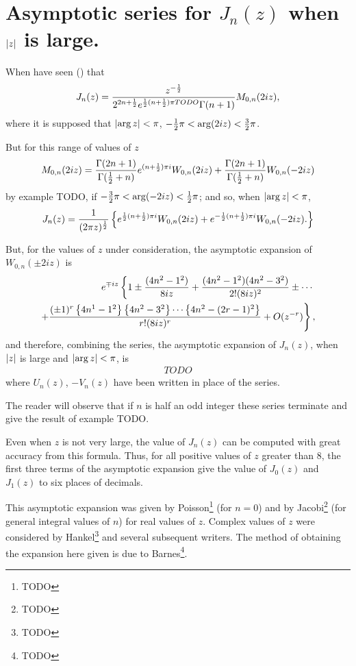\documentclass{book}
\begin{document}
\section{Asymptotic series for $J_n(z)$ when $\left| z \right|$ is large.}
When have seen () that
$$
J_n(z)
=
\frac{z^{-\frac{1}{2}}}{2^{2n+\frac{1}{2}} e^{\frac{1}{2}(n+\frac{1}{2})\pi TODO} \Gamma(n+1)}
M_{0,n}(2iz),
$$
where it is supposed that 
$\left|  \arg z  \right| < \pi$,
$-\frac{1}{2}\pi < \arg (2iz) < \frac{3}{2} \pi$.

But for this range of values of $z$
$$
M_{0,n}(2iz)
=
\frac{\Gamma(2n+1)}{\Gamma(\frac{1}{2} + n)}
e^{(n+\frac{1}{2})\pi i}
W_{0,n}(2iz)
+
\frac{\Gamma(2n+1)}{\Gamma(\frac{1}{2}+n)}
W_{0,n}(-2iz)
$$
by  example TODO,
if
$-\frac{3}{2} \pi < \arg (-2iz) < \frac{1}{2} \pi$; and so, when
$\left| \arg z \right| < \pi$,
$$
J_n(z)
=
\frac{1}{(2\pi z)^{\frac{1}{2}}}
\left\{ 
  e^{\frac{1}{2} (n+\frac{1}{2})\pi i} W_{0,n}(2iz)
  +
  e^{-\frac{1}{2} (n+\frac{1}{2})\pi i} W_{0,n}(-2iz).
   \right\}
  $$

But, for the values of $z$ under consideration, the asymptotic
expansion of $W_{0,n}(\pm 2 i z)$ is
\begin{align*}
  e^{\mp i z}
  \left\{
    1
    \pm \frac{(4n^2 - 1^2)}{8iz}
    + \frac{ (4n^2-1^2)(4n^2-3^2)}{2! (8iz)^2}
    \pm \cdots
  \right.
  \\
  \left.
    + \frac{ (\pm 1)^r \left\{ 4n^1-1^2 \right\} \left\{ 4n^2-3^2 \right\} \cdots
      \left\{ 4n^2 - (2r-1)^2 \right\}  }{r! (8iz)^r}
    + O(z^{-r})
    \right\},
  \end{align*}
  and therefore, combining the series, the asymptotic expansion of
  $J_n(z)$, when $\left| z \right|$ is large and $\left| \arg z \right| < \pi$, is
  \begin{align*}
    TODO
  \end{align*}
  where $U_n(z)$, $-V_n(z)$ have been written in place of the series.

  The reader will observe that if $n$ is half an odd integer these
  series terminate and give the result of 
  example TODO.

  Even when $z$ is not very large, the value of $J_n(z)$ can be
  computed with great accuracy from this formula. Thus, for all
  positive values of $z$ greater than $8$, the first three terms of
  the asymptotic expansion give the value of $J_0(z)$ and $J_1(z)$ to
  six places of decimals.

  This asymptotic expansion was given by Poisson\footnote{TODO} (for
  $n=0$) and by Jacobi\footnote{TODO} (for general integral values of
  $n$) for real values of $z$.
  Complex values of $z$ were considered by Hankel\footnote{TODO} and
  several subsequent writers. The method of obtaining the expansion
  here given is due to Barnes\footnote{TODO}.
\end{document}
